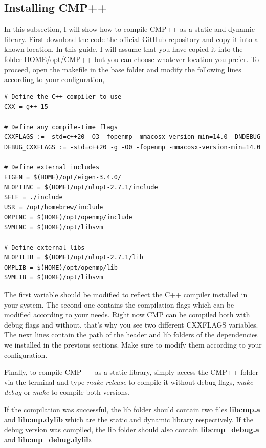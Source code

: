 \documentclass{ol-softwaremanual}
\begin{document}
\subsection{Installing CMP++}
In this subsection, I will show how to compile CMP++ as a static and dynamic library. First download the code the official GitHub repository and copy it into a known location. In this guide, I will assume that you have copied it into the folder HOME/opt/CMP++ but you can choose whatever location you prefer. To proceed, open the makefile in the base folder and modify the following lines according to your configuration,

\begin{listing}[H]
\begin{verbatim}
# Define the C++ compiler to use
CXX = g++-15

# Define any compile-time flags
CXXFLAGS := -std=c++20 -O3 -fopenmp -mmacosx-version-min=14.0 -DNDEBUG
DEBUG_CXXFLAGS := -std=c++20 -g -O0 -fopenmp -mmacosx-version-min=14.0

# Define external includes
EIGEN = $(HOME)/opt/eigen-3.4.0/
NLOPTINC = $(HOME)/opt/nlopt-2.7.1/include
SELF = ./include
USR = /opt/homebrew/include
OMPINC = $(HOME)/opt/openmp/include
SVMINC = $(HOME)/opt/libsvm

# Define external libs
NLOPTLIB = $(HOME)/opt/nlopt-2.7.1/lib
OMPLIB = $(HOME)/opt/openmp/lib
SVMLIB = $(HOME)/opt/libsvm

\end{verbatim}
\end{listing}

The first variable should be modified to reflect the C++ compiler installed in your system. The second one contains the compilation flags which can be modified according to your needs. Right now CMP can be compiled both with debug flags and without, that's why you see two different CXXFLAGS variables. The next lines contain the path of the header and lib folders of the dependencies we installed in the previous sections. Make sure to modify them according to your configuration.

\smallskip
Finally, to compile CMP++ as a static library, simply access the CMP++ folder via the terminal and type \textit{make release} to compile it without debug flags, \textit{make debug} or \textit{make} to compile both versions.

\smallskip
If the compilation was successful, the lib folder should contain two files \textbf{libcmp.a} and \textbf{libcmp.dylib} which are the static and dynamic library respectively. If the debug version was compiled, the lib folder should also contain \textbf{libcmp\_debug.a} and \textbf{libcmp\_debug.dylib}.
\end{document}
